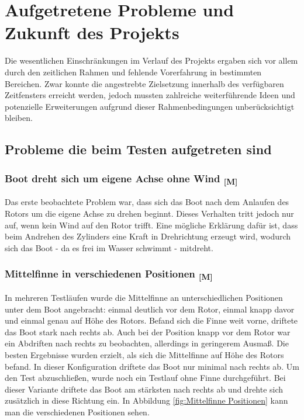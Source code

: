 \documentclass[a4paper,12pt]{article}
\begin{document}
\section{Aufgetretene Probleme und Zukunft des Projekts}

Die wesentlichen Einschränkungen im Verlauf des Projekts ergaben sich vor allem durch den zeitlichen Rahmen und fehlende Vorerfahrung in bestimmten Bereichen. Zwar konnte die angestrebte Zielsetzung innerhalb des verfügbaren Zeitfensters erreicht werden, jedoch mussten zahlreiche weiterführende Ideen und potenzielle Erweiterungen aufgrund dieser Rahmenbedingungen unberücksichtigt bleiben.

\subsection{Probleme die beim Testen aufgetreten sind}


\subsubsection{\texorpdfstring{Boot dreht sich um eigene Achse ohne Wind \textsubscript{[M]}}{Boot dreht sich um eigene Achse ohne Wind [M]}}

Das erste beobachtete Problem war, dass sich das Boot nach dem Anlaufen des Rotors um die eigene Achse zu drehen beginnt. Dieses Verhalten tritt jedoch nur auf, wenn kein Wind auf den Rotor trifft. Eine mögliche Erklärung dafür ist, dass beim Andrehen des Zylinders eine Kraft in Drehrichtung erzeugt wird, wodurch sich das Boot - da es frei im Wasser schwimmt - mitdreht.

\subsubsection{\texorpdfstring{Mittelfinne in verschiedenen Positionen \textsubscript{[M]}}{Mittelfinne in verschiedenen Positionen [M]}}

In mehreren Testläufen wurde die Mittelfinne an unterschiedlichen Positionen unter dem Boot angebracht: einmal deutlich vor dem Rotor, einmal knapp davor und einmal genau auf Höhe des Rotors. Befand sich die Finne weit vorne, driftete das Boot stark nach rechts ab. Auch bei der Position knapp vor dem Rotor war ein Abdriften nach rechts zu beobachten, allerdings in geringerem Ausmaß. Die besten Ergebnisse wurden erzielt, als sich die Mittelfinne auf Höhe des Rotors befand. In dieser Konfiguration driftete das Boot nur minimal nach rechts ab. Um den Test abzuschließen, wurde noch ein Testlauf ohne Finne durchgeführt. Bei dieser Variante driftete das Boot am stärksten nach rechts ab und drehte sich zusätzlich in diese Richtung ein. In Abbildung \ref{fig:Mittelfinne Positionen} kann man die verschiedenen Positionen sehen.
\end{document}
